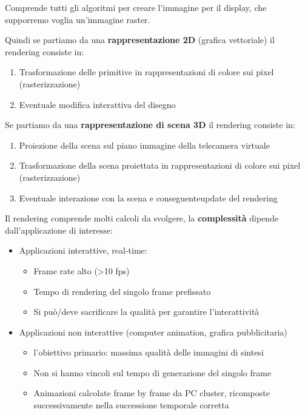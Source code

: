 \documentclass[a4paper, 10pt]{article}
\begin{document}
		\noindent
		Comprende tutti gli algoritmi per creare l'immagine per il
		display, che supporremo voglia un'immagine raster.
		
		\noindent
		Quindi se partiamo da una \textbf{rappresentazione 2D} (grafica
		vettoriale) il rendering consiste in:
		\begin{enumerate}
			\item Trasformazione delle primitive in rappresentazioni di colore sui pixel
			(rasterizzazione)
			\item Eventuale modifica interattiva del disegno
		\end{enumerate}
		Se partiamo da una \textbf{rappresentazione di scena 3D} il rendering consiste in:
		\begin{enumerate}
			\item Proiezione della scena sul piano immagine della telecamera virtuale
			\item Trasformazione della scena proiettata in rappresentazioni di colore
			sui pixel (rasterizzazione)
			\item Eventuale interazione con la scena e conseguenteupdate del
			rendering
		\end{enumerate}
		
		Il rendering comprende molti calcoli da svolgere, la \textbf{complessità} dipende dall'applicazione di interesse:
		\begin{itemize}
			\item Applicazioni interattive, real-time:
			\begin{itemize}
				\item Frame rate alto (>10 fps)
				\item Tempo di rendering del singolo frame prefissato
				\item Si può/deve sacrificare la qualità per garantire l’interattività
			\end{itemize}
			\item Applicazioni non interattive (computer animation, grafica
			pubblicitaria)
			\begin{itemize}
				\item l'obiettivo primario: massima qualità delle immagini di sintesi
				\item Non si hanno vincoli sul tempo di generazione del singolo frame
				\item Animazioni calcolate frame by frame da PC cluster, ricomposte
				successivamente nella successione temporale corretta
			\end{itemize}
		\end{itemize}
		
\end{document}
